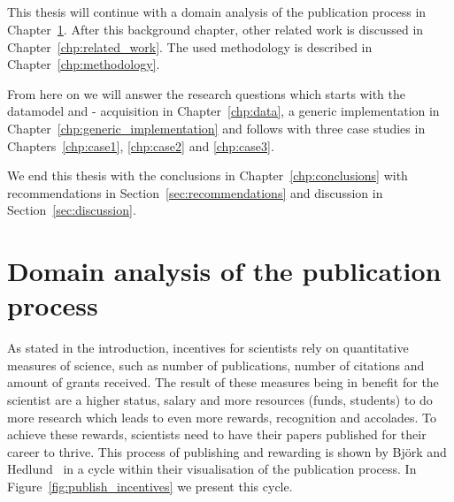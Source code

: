 \documentclass{ou-report}
\newcommand{\outline}[1]{{\color{blue} #1}}
\begin{document}
\paragraph{}
This thesis will continue with a domain analysis of the publication process in
Chapter~\ref{chp:domainanalysis}. After this background chapter, other 
related work is discussed in Chapter~\ref{chp:related_work}. The used
methodology is described in Chapter~\ref{chp:methodology}. 

From here on we will
answer the research questions which starts with the datamodel and - acquisition
in Chapter~\ref{chp:data}, a generic implementation in 
Chapter~\ref{chp:generic_implementation} and follows with three case studies in 
Chapters~\ref{chp:case1}, \ref{chp:case2} and \ref{chp:case3}. 

We end this thesis with the conclusions in Chapter~\ref{chp:conclusions} with
recommendations in Section~\ref{sec:recommendations} and discussion in
Section~\ref{sec:discussion}.




\chapter{Domain analysis of the publication process}
\label{chp:domainanalysis}

As stated in the introduction, incentives for scientists rely on quantitative 
measures of science, such as 
number of publications, number of citations and amount of grants received. The
result of these measures being in benefit for the scientist are a higher status, 
salary and more resources (funds, students) to do 
more research which leads to even more rewards, recognition and accolades. To 
achieve these rewards, scientists need to have their papers published for their 
career to thrive. This process of publishing and rewarding is shown by Bj\"ork 
and Hedlund~\cite{BH2004} in a cycle within their visualisation of the 
publication process. In Figure~\ref{fig:publish_incentives} we present this 
cycle.
\end{document}
